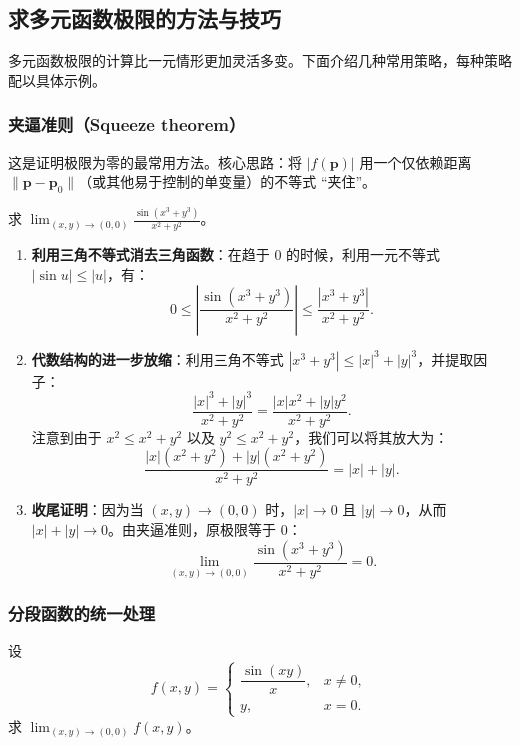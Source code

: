 \documentclass[lang=cn,11pt]{elegantbook}
\begin{document}
\subsection{求多元函数极限的方法与技巧}

多元函数极限的计算比一元情形更加灵活多变。下面介绍几种常用策略，每种策略配以具体示例。


\subsubsection{夹逼准则（Squeeze theorem）}

这是证明极限为零的最常用方法。核心思路：将 $|f(\boldsymbol{p})|$ 用一个仅依赖距离 $\|\boldsymbol{p}-\boldsymbol{p}_0\|$（或其他易于控制的单变量）的不等式 ``夹住''。

\begin{exercise} \label{ex:limit-squeeze}
求 $\displaystyle\lim_{(x,y)\to(0,0)}\frac{\sin(x^3+y^3)}{x^2+y^2}$。
\end{exercise}

\begin{solution}
\begin{enumerate}
  \item \textbf{利用三角不等式消去三角函数}：在趋于 0 的时候，利用一元不等式 $|\sin u|\leq|u|$，有：
  \[
  0\leq\left|\frac{\sin(x^3+y^3)}{x^2+y^2}\right|\leq\frac{|x^3+y^3|}{x^2+y^2}.
  \]
  \item \textbf{代数结构的进一步放缩}：利用三角不等式 $|x^3+y^3| \leqslant  |x|^3+|y|^3$，并提取因子：
  \[
  \frac{|x|^3+|y|^3}{x^2+y^2} = \frac{|x|x^2+|y|y^2}{x^2+y^2}.
  \]
  注意到由于 $x^2 \leqslant  x^2+y^2$ 以及 $y^2 \leqslant  x^2+y^2$，我们可以将其放大为：
  \[
  \frac{|x|(x^2+y^2)+|y|(x^2+y^2)}{x^2+y^2} = |x|+|y|.
  \]
  \item \textbf{收尾证明}：因为当 $(x,y)\to(0,0)$ 时，$|x|\to 0$ 且 $|y|\to 0$，从而 $|x|+|y| \to 0$。由夹逼准则，原极限等于 0：
  \[
  \boxed{\lim_{(x,y)\to(0,0)}\frac{\sin(x^3+y^3)}{x^2+y^2}=0}.
  \]
\end{enumerate}
\end{solution}


\subsubsection{分段函数的统一处理}

\begin{exercise}[含分段定义的极限] \label{ex:limit-piecewise}
设
\[
f(x,y)=
\begin{cases}
\dfrac{\sin(xy)}{x},&x \neq 0,\\[10pt]
y,&x=0.
\end{cases}
\]
求 $\displaystyle\lim_{(x,y)\to(0,0)}f(x,y)$。
\end{exercise}
\end{document}
